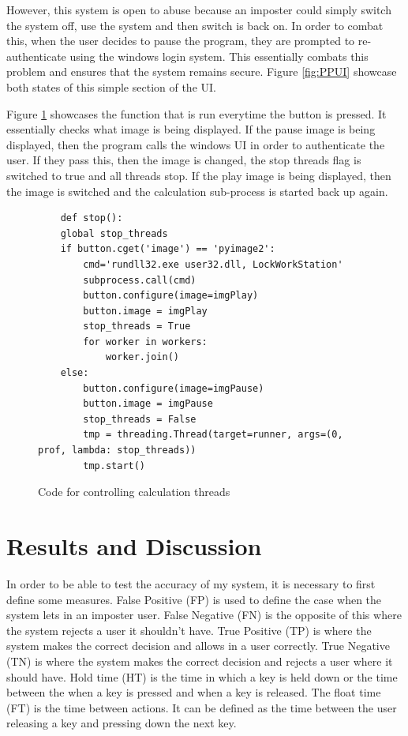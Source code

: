\documentclass[10pt,a4paper]{report}
\begin{document}
However, this system is open to abuse because an imposter could simply switch the system off, use the system and then switch is back on. In order to combat this, when the user decides to pause the program, they are prompted to re-authenticate using the windows login system. This essentially combats this problem and ensures that the system remains secure. Figure \ref{fig:PPUI} showcase both states of this simple section of the UI. 

Figure \ref{fig:stoppingThread} showcases the function that is run everytime the button is pressed. It essentially checks what image is being displayed. If the pause image is being displayed, then the program calls the windows UI in order to authenticate the user. If they pass this, then the image is changed, the stop threads flag is switched to true and all threads stop. If the play image is being displayed, then the image is switched and the calculation sub-process is started back up again.

\begin{figure}
	\begin{lstlisting}
	def stop():
    global stop_threads
    if button.cget('image') == 'pyimage2':
        cmd='rundll32.exe user32.dll, LockWorkStation'
        subprocess.call(cmd)
        button.configure(image=imgPlay)
        button.image = imgPlay
        stop_threads = True
        for worker in workers:
            worker.join()
    else:
        button.configure(image=imgPause)
        button.image = imgPause
        stop_threads = False
        tmp = threading.Thread(target=runner, args=(0, prof, lambda: stop_threads))
        tmp.start()
        \end{lstlisting}
        \caption{Code for controlling calculation threads}
        \label{fig:stoppingThread}
\end{figure}

\chapter{Results and Discussion}

In order to be able to test the accuracy of my system, it is necessary to first define some measures. False Positive (FP) is used to define the case when the system lets in an imposter user. False Negative (FN) is the opposite of this where the system rejects a user it shouldn't have. True Positive (TP) is where the system makes the correct decision and allows in a user correctly. True Negative (TN) is where the system makes the correct decision and rejects a user where it should have. Hold time (HT) is the time in which a key is held down or the time between the when a key is pressed and when a key is released. The float time (FT) is the time between actions. It can be defined as the time between the user releasing a key and pressing down the next key.
\end{document}
